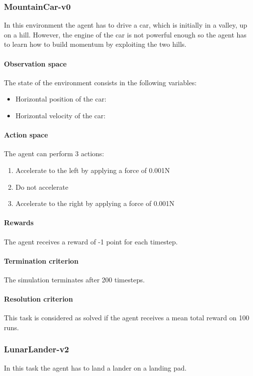 \documentclass[review,english]{elsarticle}
\begin{document}
\subsubsection{MountainCar-v0}
In this environment the agent has to drive a car, which is initially in a valley, up on a hill.
However, the engine of the car is not powerful enough so the agent has to learn how to build momentum by exploiting the two hills.

\paragraph{Observation space}
The state of the environment consists in the following variables:
\begin{itemize}
    \item Horizontal position of the car: 
    \item Horizontal velocity of the car: 
\end{itemize}

\paragraph{Action space}
The agent can perform 3 actions:
\begin{enumerate}
    \item Accelerate to the left by applying a force of 0.001N
    \item Do not accelerate
    \item Accelerate to the right by applying a force of 0.001N
\end{enumerate}

\paragraph{Rewards}
The agent receives a reward of -1 point for each timestep.

\paragraph{Termination criterion}
The simulation terminates after 200 timesteps.

\paragraph{Resolution criterion}
This task is considered as solved if the agent receives a mean total reward  on 100 runs.

\subsubsection{LunarLander-v2}
In this task the agent has to land a lander on a landing pad.
\end{document}
